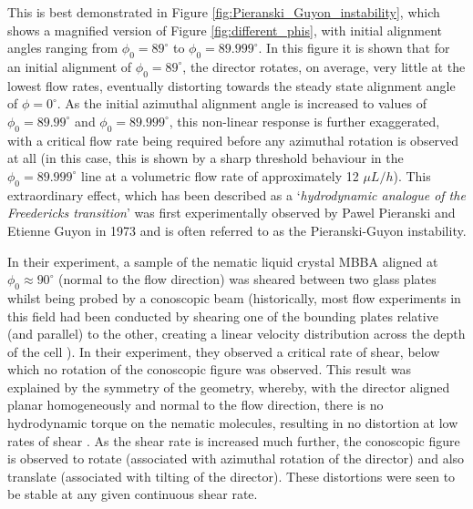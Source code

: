 This is best demonstrated in Figure \ref{fig:Pieranski_Guyon_instability}, which shows a magnified version of Figure \ref{fig:different_phis}, with initial alignment angles ranging from $\phi_0=89^{\circ}$ to $\phi_0=89.999^{\circ}$. In this figure it is shown that for an initial alignment of $\phi_0=89^{\circ}$, the director rotates, on average, very little at the lowest flow rates, eventually distorting towards the steady state alignment angle of $\phi=0^{\circ}$. As the initial azimuthal alignment angle is increased to values of $\phi_0=89.99^{\circ}$ and $\phi_0=89.999^{\circ}$, this non-linear response is further exaggerated, with a critical flow rate being required before any azimuthal rotation is observed at all (in this case, this is shown by a sharp threshold behaviour in the $\phi_0=89.999^{\circ}$ line at a volumetric flow rate of approximately 12 $\mu L/h$). This extraordinary effect, which has been described as a `\textit{hydrodynamic analogue of the Freedericks transition}' was first experimentally observed by Pawel Pieranski and Etienne Guyon in 1973 \cite{Pieranski1973} and is often referred to as the Pieranski-Guyon instability.

In their experiment, a sample of the nematic liquid crystal MBBA aligned at $\phi_0\approx90^{\circ}$ (normal to the flow direction) was sheared between two glass plates whilst being probed by a conoscopic beam (historically, most flow experiments in this field had been conducted by shearing one of the bounding plates relative (and parallel) to the other, creating a linear velocity distribution across the depth of the cell \citep{Boudreau1999,Horn2003,VanHorn2000,Graf1992,Borzsonyi1998,Kemp1971}). In their experiment, they observed a critical rate of shear, below which no rotation of the conoscopic figure was observed. This result was explained by the symmetry of the geometry, whereby, with the director aligned planar homogeneously and normal to the flow direction, there is no hydrodynamic torque on the nematic molecules, resulting in no distortion at low rates of shear \cite{Pieranski1973}. As the shear rate is increased much further, the conoscopic figure is observed to rotate (associated with azimuthal rotation of the director) and also translate (associated with tilting of the director). These distortions were seen to be stable at any given continuous shear rate.

